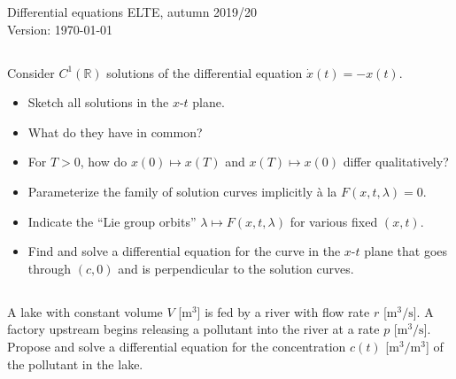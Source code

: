 \documentclass[12pt,a4paper]{article}
\begin{document}
    
    Differential equations  \hfill  ELTE, autumn 2019/20
    \\
    {\color{white} } \hfill {\tiny Version: \today}
    
    
    \subsection{}
    
    Consider $C^1(\mathbb{R})$ 
    solutions of the differential equation $\dot{x}(t) = -x(t)$.
    \begin{itemize}
    \item 
        Sketch all solutions in the $x$-$t$ plane.
    \item
        What do they have in common?
    \item
        For $T > 0$,
        how do
        $x(0) \mapsto x(T)$
        and
        $x(T) \mapsto x(0)$
        differ qualitatively?
    \item
        Parameterize the family of solution curves implicitly
        \`a la $F(x, t, \lambda) = 0$.
    \item
        Indicate the ``Lie group orbits'' $\lambda \mapsto F(x, t, \lambda)$ for various fixed $(x, t)$.
    \item
        Find and solve a differential equation
        for the curve in the $x$-$t$ plane
        that goes
        through $(c, 0)$
        and is perpendicular
        to the solution curves.
    \end{itemize}
    
    
    \subsection{}
    
    A lake with constant volume $V$ [$\mathrm{m^3}$]
    is fed by a river with flow rate $r$ [$\mathrm{m^3/s}$].
    A factory upstream begins releasing a pollutant
    into the river at a rate $p$ [$\mathrm{m^3/s}$].
    Propose and solve a differential equation
    for the concentration $c(t)$ [$\mathrm{m^3/m^3}$] of the pollutant in the lake.
    
    
\end{document}

